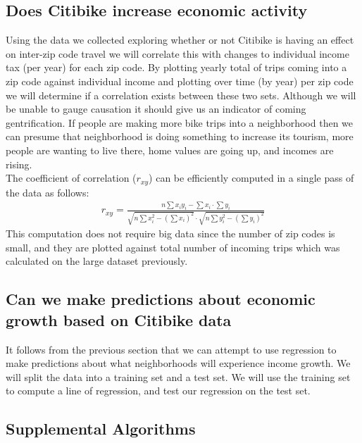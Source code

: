 \documentclass{article}
\begin{document}
\subsection{Does Citibike increase economic activity}
Using the data we collected exploring whether or not Citibike is having an effect on inter-zip code travel we will correlate this with changes to individual income tax (per year) for each zip code. By plotting yearly total of trips coming into a zip code against individual income and plotting over time (by year) per zip code we will determine if a correlation exists between these two sets. Although we will be unable to gauge causation it should give us an indicator of coming gentrification. If people are making more bike trips into a neighborhood then we can presume that neighborhood is doing something to increase its tourism, more people are wanting to live there, home values are going up, and incomes are rising.\\
The coefficient of correlation ($r_{xy}$) can be efficiently computed in a single pass of the data as follows:
\begin{align*}
r_{xy} = \frac{n\sum{x_{i}y_{i}} - \sum{x_i}\cdot\sum{y_i}}{\sqrt{n\sum{x^2_i}-(\sum{x_i})^2}\cdot \sqrt{n\sum{y^2_i}-(\sum{y_i})^2}}
\end{align*}
This computation does not require big data since the number of zip codes is small, and they are plotted against total number of incoming trips which was calculated on the large dataset previously.

\subsection{Can we make predictions about economic growth based on Citibike data}
It follows from the previous section that we can attempt to use regression to make predictions about what neighborhoods will experience income growth. We will split the data into a training set and a test set. We will use the training set to compute a line of regression, and test our regression on the test set.


\subsection{Supplemental Algorithms}
\end{document}
